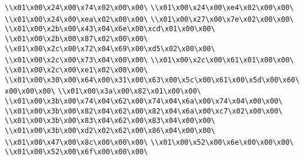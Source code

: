 \verb|\\x01\x00\x24\x00\x74\x02\x00\x00\|\newline
\verb|\\x01\x00\x24\x00\xe4\x02\x00\x00\|\newline
\verb|\\x01\x00\x24\x00\xea\x02\x00\x00\|\newline
\verb|\\x01\x00\x27\x00\x7e\x02\x00\x00\|\newline
\verb|\\x01\x00\x2b\x00\x43\x04\x6e\x00\xcd\x01\x00\x00\|\newline
\verb|\\x01\x00\x2b\x00\x87\x02\x00\x00\|\newline
\verb|\\x01\x00\x2c\x00\x72\x04\x69\x00\xd5\x02\x00\x00\|\newline
\verb|\\x01\x00\x2c\x00\x73\x04\x00\x00\|\newline
\verb|\\x01\x00\x2c\x00\x61\x01\x00\x00\|\newline
\verb|\\x01\x00\x2c\x00\xe1\x02\x00\x00\|\newline
\verb|\\x01\x00\x30\x00\x64\x00\x31\x00\x63\x00\x5c\x00\x61\x00\x5d\x00\x60\x00\x00\x00\|\newline
\verb|\\x01\x00\x3a\x00\x82\x01\x00\x00\|\newline
\verb|\\x01\x00\x3b\x00\x74\x04\x62\x00\x74\x04\x6a\x00\x74\x04\x00\x00\|\newline
\verb|\\x01\x00\x3b\x00\x82\x04\x62\x00\x82\x04\x6a\x00\xc7\x02\x00\x00\|\newline
\verb|\\x01\x00\x3b\x00\x83\x04\x62\x00\x83\x04\x00\x00\|\newline
\verb|\\x01\x00\x3b\x00\xd2\x02\x62\x00\x86\x04\x00\x00\|\newline
\verb|\\x01\x00\x47\x00\x8c\x00\x00\x00\|\newline
\verb|\\x01\x00\x52\x00\x6e\x00\x00\x00\|\newline
\verb|\\x01\x00\x52\x00\x6f\x00\x00\x00\|\newline
